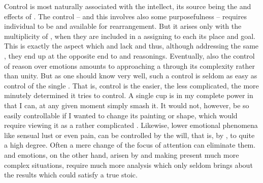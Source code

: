 Control is most naturally associated with the intellect, its source being the
 and  effects of .  The
control -- and this involves also some purposefulness -- requires individual
 to be  and available for rearrangement. But it
arises only with the multiplicity of , when they are included in a
 assigning to each its place and goal. This  is
exactly the aspect which  and  lack and thus, although
addressing the same , they end up at the opposite end to
 and reasonings.  Eventually, also the control of reason over
emotions amounts to approaching a  through its complexity rather
than unity. But as one should know very well, such a control is seldom as easy
as control of the single . That is, control is the easier, the less
complicated, the more minutely determined  it tries to control. A
single cup is in my complete power in that I can, at any given moment simply
smash it. It would not, however, be so easily controllable if I wanted to change
its painting or shape, which would require viewing it as a rather complicated
.  Likewise, lower emotional phenomena like sensual lust or even
pain, can be controlled by the will, that is, by , to quite a high
degree. Often a mere change of the focus of attention can eliminate them.
 and emotions, on the other hand, arisen by and making present much
more complex situations, require much more analysis which only seldom brings
about the results which could satisfy a true stoic. 



